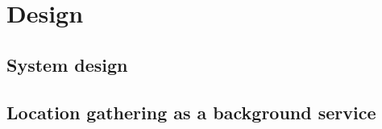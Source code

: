 \section{Design}

\subsection{System design}


\subsection{Location gathering as a background service}
